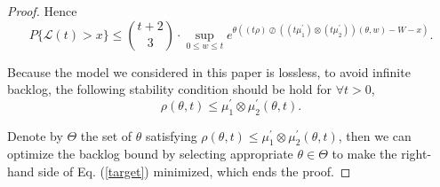 \documentclass[12pt]{article}
\newtheorem{proof}{Proof}
\begin{document}
\begin{proof}
Hence
\begin{equation}\label{target}
P\{\mathcal{L}(t)>x\}\leq {t+2\choose 3}\cdot \sup_{0\leq w\leq t}e^{\theta((t\rho)\oslash((t\mu_1^\prime)\otimes(t\mu_2^\prime))(\theta,w)-W-x)}.
\end{equation}

Because the model we considered in this paper is lossless, to avoid infinite backlog, the following stability condition should be hold for $\forall t>0$,
$$\rho(\theta,t)\leq \mu_1^\prime\otimes\mu_2^\prime(\theta,t).$$

Denote by $\Theta$ the set of $\theta$ satisfying $\rho(\theta,t)\leq \mu_1^\prime\otimes\mu_2^\prime(\theta,t)$, then we can optimize the backlog bound by selecting appropriate $\theta\in\Theta$ to make the right-hand side of Eq. (\ref{target}) minimized, which ends the proof.
\end{proof}
\end{document}
